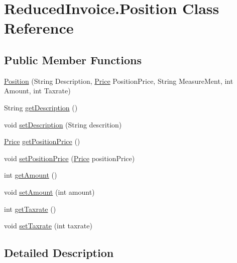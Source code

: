 \hypertarget{class_reduced_invoice_1_1_position}{}\section{Reduced\+Invoice.\+Position Class Reference}
\label{class_reduced_invoice_1_1_position}
\subsection*{Public Member Functions}
\begin{DoxyCompactItemize}
\item 
\hyperlink{class_reduced_invoice_1_1_position_a2668f00d53cf5704f047f300f77a42ad}{Position} (String Description, \hyperlink{class_reduced_invoice_1_1_price}{Price} Position\+Price, String Measure\+Ment, int Amount, int Taxrate)
\item 
String \hyperlink{class_reduced_invoice_1_1_position_ab4c6da1a734c40337974e76ea4491dbf}{get\+Description} ()
\item 
void \hyperlink{class_reduced_invoice_1_1_position_a86b0bb99ef806d0e8298e8b5030f8964}{set\+Description} (String descrition)
\item 
\hyperlink{class_reduced_invoice_1_1_price}{Price} \hyperlink{class_reduced_invoice_1_1_position_ace39a33b2c836d4689b4eae38f6c3ca3}{get\+Position\+Price} ()
\item 
void \hyperlink{class_reduced_invoice_1_1_position_aeac9fdead656ad61a41dbca42a4d8fdd}{set\+Position\+Price} (\hyperlink{class_reduced_invoice_1_1_price}{Price} position\+Price)
\item 
int \hyperlink{class_reduced_invoice_1_1_position_a5f2aa6f49886d3186e53e76a55dfdf91}{get\+Amount} ()
\item 
void \hyperlink{class_reduced_invoice_1_1_position_afd4c38ea287c5e39f5537673f4efc1ce}{set\+Amount} (int amount)
\item 
int \hyperlink{class_reduced_invoice_1_1_position_ae6fa813dd7b205c91b5d340e467751da}{get\+Taxrate} ()
\item 
void \hyperlink{class_reduced_invoice_1_1_position_a44eab6fd92814298a7e34ff1ffd13422}{set\+Taxrate} (int taxrate)
\end{DoxyCompactItemize}


\subsection{Detailed Description}



